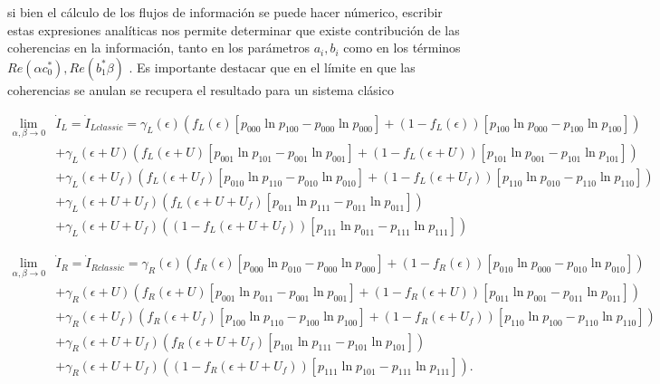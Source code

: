 \begin{appendixs}
si bien el cálculo de los flujos de información se puede hacer númerico, escribir estas expresiones analíticas nos permite determinar que existe contribución de las coherencias en la información, tanto en los parámetros $a_{i},b_{i}$ como en los términos $Re(\alpha c^{*}_{0}),Re(b^{*}_{1} \beta)$ . Es importante destacar que en el  límite en que las coherencias se anulan se recupera el resultado para un sistema clásico

\begin{align*}
 \lim_{\alpha,\beta \to 0}  & \dot{I}_{L}  = \dot{I}_{Lclassic}   =  \gamma_{L}(\epsilon)(f_{L}(\epsilon)[p_{000}\ln p_{100} - p_{000}\ln p_{000}] + (1-f_{L}(\epsilon))[p_{100}\ln p_{000} - p_{100}\ln p_{100} ] )  \\ 
      & + \gamma_{L}(\epsilon + U)(f_{L}(\epsilon + U)[p_{001}\ln p_{101} - p_{001}\ln p_{001}] + (1-f_{L}(\epsilon + U))[p_{101}\ln p_{001} -p_{101}\ln p_{101} ]   ) \\  
      & + \gamma_{L}(\epsilon + U_{f})( f_{L}(\epsilon + U_{f})[p_{010}\ln p_{110} -p_{010}\ln p_{010} ]  + (1-f_{L}(\epsilon + U_{f}))[p_{110}\ln p_{010} - p_{110}\ln p_{110} ] ) \\  
      & + \gamma_{L}(\epsilon + U + U_{f})( f_{L}(\epsilon + U + U_{f})[p_{011}\ln p_{111}- p_{011}\ln p_{011}]) \\   
      & + \gamma_{L}(\epsilon + U + U_{f})( (1-f_{L}(\epsilon+U+U_{f}) )[p_{111}\ln p_{011} - p_{111}\ln p_{111}])   
\end{align*}

\begin{align*}
 \lim_{\alpha,\beta \to 0}  & \dot{I}_{R}  = \dot{I}_{Rclassic}   =  \gamma_{R}(\epsilon)(f_{R}(\epsilon)[p_{000}\ln p_{010} - p_{000}\ln p_{000}] + (1-f_{R}(\epsilon))[p_{010}\ln p_{000} - p_{010}\ln p_{010} ] )  \\ 
      & + \gamma_{R}(\epsilon + U)(f_{R}(\epsilon + U)[p_{001}\ln p_{011} - p_{001}\ln p_{001}] + (1-f_{R}(\epsilon + U))[p_{011}\ln p_{001} -p_{011}\ln p_{011} ]   ) \\  
      & + \gamma_{R}(\epsilon + U_{f})( f_{R}(\epsilon + U_{f})[p_{100}\ln p_{110} -p_{100}\ln p_{100} ]  + (1-f_{R}(\epsilon + U_{f}))[p_{110}\ln p_{100} - p_{110}\ln p_{110} ] ) \\  
      & + \gamma_{R}(\epsilon + U + U_{f})( f_{R}(\epsilon + U + U_{f})[p_{101}\ln p_{111}- p_{101}\ln p_{101}]) \\   
      & + \gamma_{R}(\epsilon + U + U_{f})( (1-f_{R}(\epsilon+U+U_{f}) )[p_{111}\ln p_{101} - p_{111}\ln p_{111}]).   
\end{align*}

\label{apendix5infoflow}

\end{appendixs}